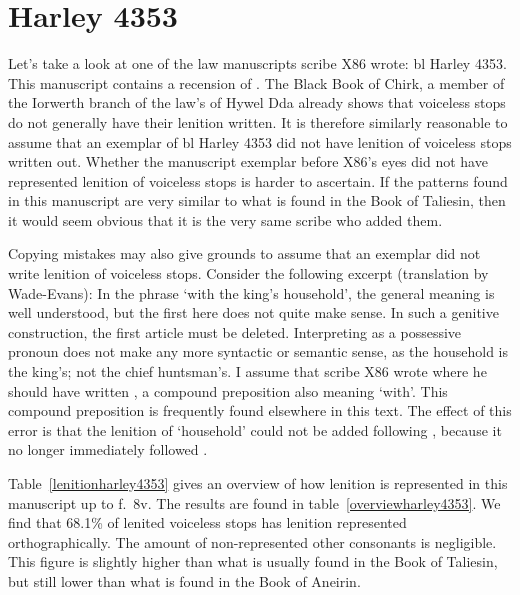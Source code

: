 \section{Harley 4353}
Let's take a look at one of the law manuscripts scribe X86 wrote: \gls{bl} Harley 4353. This manuscript contains a recension of . The Black Book of Chirk, a member of the Iorwerth branch of the law's of Hywel Dda already shows that voiceless stops do not generally have their lenition written. It is therefore similarly reasonable to assume that an exemplar of \gls{bl} Harley 4353 did not have lenition of voiceless stops written out. Whether the manuscript exemplar before X86's eyes did not have represented lenition of voiceless stops is harder to ascertain. If the patterns found in this manuscript are very similar to what is found in the Book of Taliesin, then it would seem obvious that it is the very same scribe who added them. 

Copying mistakes may also give grounds to assume that an exemplar did not write lenition of voiceless stops. Consider the following excerpt (translation by Wade-Evans):
In the phrase  `with the king's household', the general meaning is well understood, but the first  here does not quite make sense. In such a genitive construction, the first article must be deleted. Interpreting  as a possessive pronoun does not make any more syntactic or semantic sense, as the household is the king's; not the chief huntsman's. I assume that scribe X86 wrote  where he should have written , a compound preposition also meaning `with'. This compound preposition is frequently found elsewhere in this text. The effect of this error is that the lenition of  `household' could not be added following , because it no longer immediately followed .

Table~\ref{lenitionharley4353} gives an overview of how lenition is represented in this manuscript up to f.\ 8v. The results are found in table~\ref{overviewharley4353}. We find that 68.1\% of lenited voiceless stops has lenition represented orthographically. The amount of non-represented other consonants is negligible. This figure is slightly higher than what is usually found in the Book of Taliesin, but still lower than what is found in the Book of Aneirin. 

